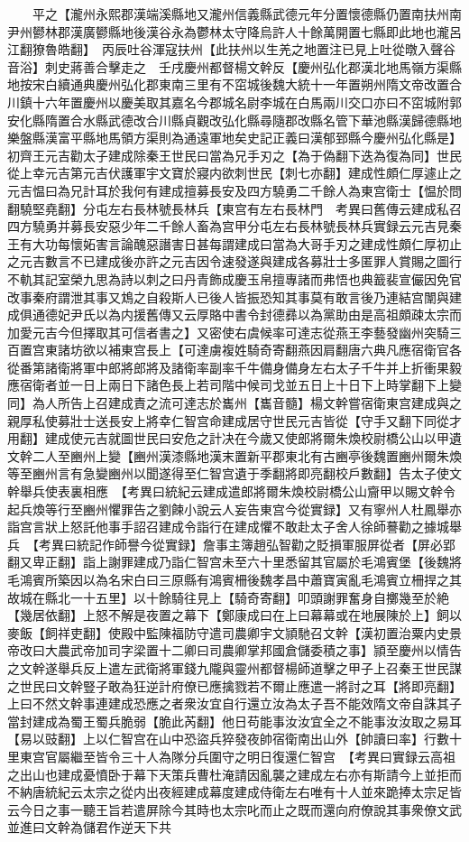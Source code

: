 　　平之【瀧州永熙郡漢端溪縣地又瀧州信義縣武德元年分置懷德縣仍置南扶州南尹州鬰林郡漢廣鬰縣地後漢谷永為鬱林太守降烏許人十餘萬開置七縣即此地也瀧呂江翻獠魯皓翻】　丙辰吐谷渾寇扶州【此扶州以生羌之地置注已見上吐從暾入聲谷音浴】刺史蔣善合擊走之　壬戌慶州都督楊文幹反【慶州弘化郡漢北地馬嶺方渠縣地按宋白續通典慶州弘化郡東南三里有不窋城後魏大統十一年置朔州隋文帝改置合川鎮十六年置慶州以慶美取其嘉名今郡城名尉李城在白馬兩川交口亦曰不窋城附郭安化縣隋置合水縣武德改合川縣貞觀改弘化縣尋隨郡改縣名管下華池縣漢歸德縣地樂盤縣漢富平縣地馬領方渠則為通遠軍地矣史記正義曰漢郁郅縣今慶州弘化縣是】初齊王元吉勸太子建成除秦王世民曰當為兄手刃之【為于偽翻下迭為復為同】世民從上幸元吉第元吉伏護軍宇文寶於寢内欲刺世民【刺七亦翻】建成性頗仁厚遽止之元吉愠曰為兄計耳於我何有建成擅募長安及四方驍勇二千餘人為東宫衛士【愠於問翻驍堅堯翻】分屯左右長林號長林兵【東宫有左右長林門　考異曰舊傳云建成私召四方驍勇并募長安惡少年二千餘人畜為宫甲分屯左右長林號長林兵實録云元吉見秦王有大功每懷妬害言論醜惡譖害日甚每謂建成曰當為大哥手刃之建成性頗仁厚初止之元吉數言不已建成後亦許之元吉因令速發遂與建成各募壯士多匿罪人賞賜之圖行不軌其記室榮九思為詩以刺之曰丹青飾成慶玉帛擅專諸而弗悟也典籖裴宣儼因免官改事秦府謂泄其事又鴆之自殺斯人已後人皆振恐知其事莫有敢言後乃連結宫闈與建成俱通德妃尹氏以為内援舊傳又云厚賂中書令封德彞以為黨助由是高祖頗疎太宗而加愛元吉今但擇取其可信者書之】又密使右虞候率可達志從燕王李藝發幽州突騎三百置宫東諸坊欲以補東宫長上【可達虜複姓騎奇寄翻燕因肩翻唐六典凡應宿衛官各從番第諸衛將軍中郎將郎將及諸衛率副率千牛備身備身左右太子千牛并上折衝果毅應宿衛者並一日上兩日下諸色長上若司階中候司戈並五日上十日下上時掌翻下上變同】為人所告上召建成責之流可達志於巂州【巂音髓】楊文幹嘗宿衛東宫建成與之親厚私使募壯士送長安上將幸仁智宫命建成居守世民元吉皆從【守手又翻下同從才用翻】建成使元吉就圖世民曰安危之計决在今歲又使郎將爾朱煥校尉橋公山以甲遺文幹二人至豳州上變【豳州漢漆縣地漢末置新平郡東北有古豳亭後魏置豳州爾朱煥等至豳州言有急變豳州以聞遂得至仁智宫遺于季翻將即亮翻校戶數翻】告太子使文幹舉兵使表裏相應　【考異曰統紀云建成遣郎將爾朱煥校尉橋公山齎甲以賜文幹令起兵煥等行至豳州懼罪告之劉餗小說云人妄告東宫今從實録】又有寧州人杜鳳舉亦詣宫言狀上怒託他事手詔召建成令詣行在建成懼不敢赴太子舍人徐師謩勸之據城舉兵　【考異曰統記作師譽今從實録】詹事主簿趙弘智勸之貶損軍服屏從者【屏必郢翻又卑正翻】詣上謝罪建成乃詣仁智宫未至六十里悉留其官屬於毛鴻賓堡【後魏將毛鴻賓所築因以為名宋白曰三原縣有鴻賓柵後魏孝昌中蕭寶寅亂毛鴻賓立柵捍之其故城在縣北一十五里】以十餘騎往見上【騎奇寄翻】叩頭謝罪奮身自擲幾至於絶【幾居依翻】上怒不解是夜置之幕下【鄭康成曰在上曰幕幕或在地展陳於上】飼以麥飯【飼祥吏翻】使殿中監陳福防守遣司農卿宇文頴馳召文幹【漢初置治粟内史景帝改曰大農武帝加司字梁置十二卿曰司農卿掌邦國倉儲委積之事】頴至慶州以情告之文幹遂舉兵反上遣左武衛將軍錢九隴與靈州都督楊師道擊之甲子上召秦王世民謀之世民曰文幹豎子敢為狂逆計府僚已應擒戮若不爾止應遣一將討之耳【將即亮翻】上曰不然文幹事連建成恐應之者衆汝宜自行還立汝為太子吾不能效隋文帝自誅其子當封建成為蜀王蜀兵脆弱【脆此芮翻】他日苟能事汝汝宜全之不能事汝汝取之易耳【易以豉翻】上以仁智宫在山中恐盜兵猝發夜帥宿衛南出山外【帥讀曰率】行數十里東宫官屬繼至皆令三十人為隊分兵圍守之明日復還仁智宫　【考異曰實録云高祖之出山也建成憂憤卧于幕下天策兵曹杜淹請因亂襲之建成左右亦有斯請今上並拒而不納唐統紀云太宗之從内出夜經建成幕度建成侍衛左右唯有十人並來跪捧太宗足皆云今日之事一聽王旨若遣屏除今其時也太宗叱而止之既而還向府僚說其事衆僚文武並進曰文幹為儲君作逆天下共